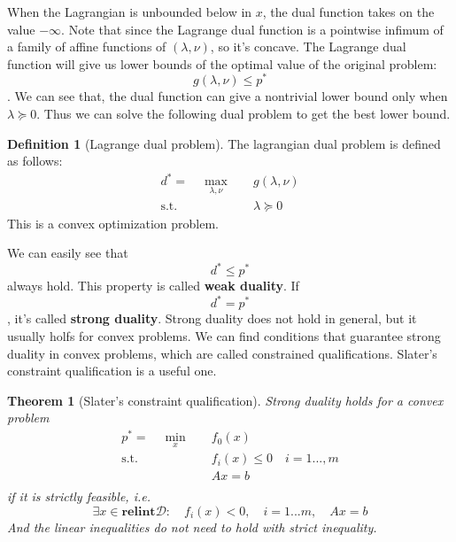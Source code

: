 \documentclass[
]{book}
\newtheorem{theorem}{Theorem}[chapter]
\theoremstyle{definition}
\newtheorem{definition}{Definition}[chapter]
\theoremstyle{definition}
\theoremstyle{definition}
\theoremstyle{definition}
\theoremstyle{remark}
\begin{document}
When the Lagrangian is unbounded below in \(x\), the dual function takes on the value \(-\infty\). Note that since the Lagrange dual function is a pointwise infimum of a family of affine functions of \((\lambda,\nu)\), so it's concave. The Lagrange dual function will give us lower bounds of the optimal value of the original problem: \[g(\lambda,\nu)\leq p^*\]. We can see that, the dual function can give a nontrivial lower bound only when \(\lambda\succeq 0\). Thus we can solve the following dual problem to get the best lower bound.

\begin{definition}[Lagrange dual problem]
\protect\hypertarget{def:defdualprob}{}\label{def:defdualprob}The lagrangian dual problem is defined as follows:
\begin{equation}
  \begin{aligned}
  d^* = \quad \max_{\lambda,\nu} \quad & g(\lambda,\nu)\\
  \textrm{s.t.} \quad & \lambda\succeq 0
  \end{aligned}
  \end{equation}
This is a convex optimization problem.
\end{definition}

We can easily see that \[d^*\leq p^*\] always hold. This property is called \textbf{weak duality}. If \[d^*=p^*\], it's called \textbf{strong duality}. Strong duality does not hold in general, but it usually holfs for convex problems. We can find conditions that guarantee strong duality in convex problems, which are called constrained qualifications. Slater's constraint qualification is a useful one.

\begin{theorem}[Slater's constraint qualification]
\protect\hypertarget{thm:slater}{}\label{thm:slater}Strong duality holds for a convex problem
\begin{equation}
  \begin{aligned}
  p^* = \quad \min_{x} \quad & f_0(x)\\
  \textrm{s.t.} \quad & f_i(x)\leq 0\quad i=1...,m\\
    & Ax=b   \\
  \end{aligned}
 \end{equation}
if it is strictly feasible, i.e.
\[\exists x\in\textbf{relint}\mathcal{D}:\quad f_i(x)<0,\quad i=1...m,\quad Ax=b\]
And the linear inequalities do not need to hold with strict inequality.
\end{theorem}
\end{document}
